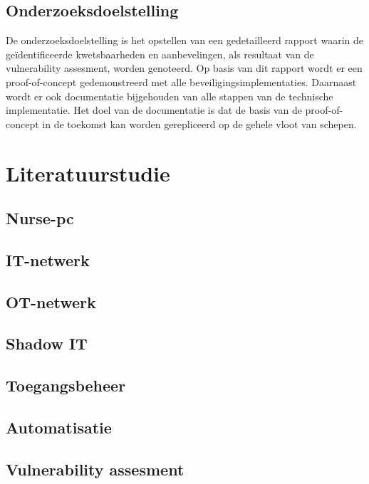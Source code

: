 \subsection{Onderzoeksdoelstelling}
De onderzoeksdoelstelling is het opstellen van een gedetailleerd rapport waarin de geïdentificeerde kwetsbaarheden en aanbevelingen, als resultaat van de vulnerability assesment, worden genoteerd.
Op basis van dit rapport wordt er een proof-of-concept gedemonstreerd met alle beveiligingsimplementaties.
Daarnaast wordt er ook documentatie bijgehouden van alle stappen van de technische implementatie.
Het doel van de documentatie is dat de basis van de proof-of-concept in de toekomst kan worden gerepliceerd op de gehele vloot van schepen.



\section{Literatuurstudie}%
\label{sec:literatuurstudie}
\subsection{Nurse-pc}
\subsection{IT-netwerk}
\subsection{OT-netwerk}
\subsection{Shadow IT}
\subsection{Toegangsbeheer}
\subsection{Automatisatie}
\subsection{Vulnerability assesment}


